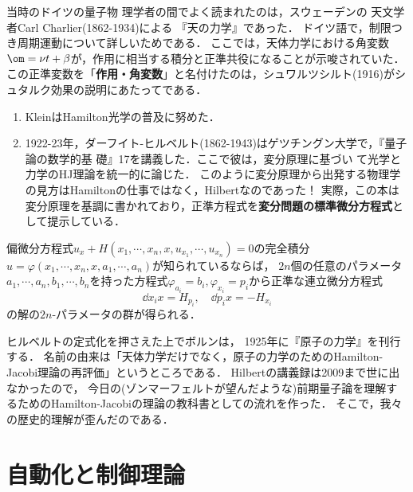 \documentclass[uplatex,dvipdfmx]{jsreport}
\begin{document}
\begin{history}
    当時のドイツの量子物
理学者の間でよく読まれたのは，スウェーデンの
天文学者Carl Charlier(1862-1934)による
『天の力学』であった．
ドイツ語で，制限つき周期運動について詳しいためである．
ここでは，天体力学における角変数$\om=\nu t+\beta$が，作用に相当する積分と正準共役になることが示唆されていた．
この正準変数を「\textbf{作用・角変数}」と名付けたのは，シュワルツシルト(1916)がシュタルク効果の説明にあたってである．
\end{history}

\begin{history}
    \begin{enumerate}
        \item KleinはHamilton光学の普及に努めた．
        \item 1922-23年，ダーフイト-ヒルベルト(1862-1943)はゲツチングン大学で，『量子論の数学的基
        礎』17を講義した．ここで彼は，変分原理に基づい
        て光学と力学のHJ理論を統一的に論じた．
        このように変分原理から出発する物理学の見方はHamiltonの仕事ではなく，Hilbertなのであった！
        実際，この本は変分原理を基調に書かれており，正準方程式を\textbf{変分問題の標準微分方程式}として提示している．
    \end{enumerate}
\end{history}

\begin{theorem}[Jacobi]
    偏微分方程式$u_x+H(x_1,\cdots,x_n,x,u_{x_1},\cdots,u_{x_n})=0$の完全積分$u=\varphi(x_1,\cdots,x_n,x,a_1,\cdots,a_n)$が知られているならば，
    $2n$個の任意のパラメータ$a_1,\cdots,a_n,b_1,\cdots,b_n$を持った方程式$\varphi_{a_i}=b_i,\varphi_{x_i}=p_i$から正準な連立微分方程式
    \[\dd{x_i}{x}=H_{p_i},\quad\dd{p_i}{x}=-H_{x_i}\]
    の解の$2n$-パラメータの群が得られる．
\end{theorem}

\begin{history}
    ヒルベルトの定式化を押さえた上でボルンは，
    1925年に『原子の力学』を刊行する．
    名前の由来は「天体力学だけでなく，原子の力学のためのHamilton-Jacobi理論の再評価」というところである．
    Hilbertの講義録は2009まで世に出なかったので，
    今日の(ゾンマーフェルトが望んだような)前期量子論を理解するためのHamilton-Jacobiの理論の教科書としての流れを作った．
    そこで，我々の歴史的理解が歪んだのである．
\end{history}

\chapter{自動化と制御理論}
\end{document}
